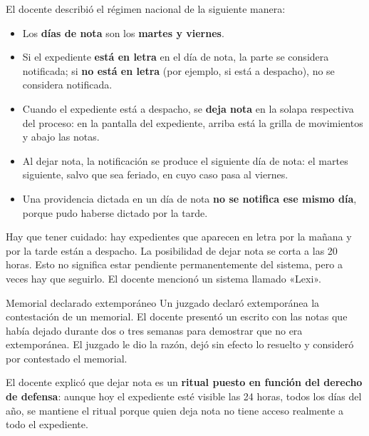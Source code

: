 \documentclass[12pt,oneside]{book}
\begin{document}
El docente describió el régimen nacional de la siguiente manera:

\begin{itemize}
    \item Los \textbf{días de nota} son los \textbf{martes y viernes}.
    \item Si el expediente \textbf{está en letra} en el día de nota, la parte se considera notificada; si \textbf{no está en letra} (por ejemplo, si está a despacho), no se considera notificada.
    \item Cuando el expediente está a despacho, se \textbf{deja nota} en la solapa respectiva del proceso: en la pantalla del expediente, arriba está la grilla de movimientos y abajo las notas.
    \item Al dejar nota, la notificación se produce el siguiente día de nota: el martes siguiente, salvo que sea feriado, en cuyo caso pasa al viernes.
    \item Una providencia dictada en un día de nota \textbf{no se notifica ese mismo día}, porque pudo haberse dictado por la tarde.
\end{itemize}

\begin{important}
Hay que tener cuidado: hay expedientes que aparecen en letra por la mañana y por la tarde están a despacho. La posibilidad de dejar nota se corta a las 20 horas. Esto no significa estar pendiente permanentemente del sistema, pero a veces hay que seguirlo. El docente mencionó un sistema llamado «Lexi».
\end{important}

\begin{example}{Memorial declarado extemporáneo}
Un juzgado declaró extemporánea la contestación de un memorial. El docente presentó un escrito con las notas que había dejado durante dos o tres semanas para demostrar que no era extemporánea. El juzgado le dio la razón, dejó sin efecto lo resuelto y consideró por contestado el memorial.
\end{example}

El docente explicó que dejar nota es un \textbf{ritual puesto en función del derecho de defensa}: aunque hoy el expediente esté visible las 24 horas, todos los días del año, se mantiene el ritual porque quien deja nota no tiene acceso realmente a todo el expediente.
\end{document}
